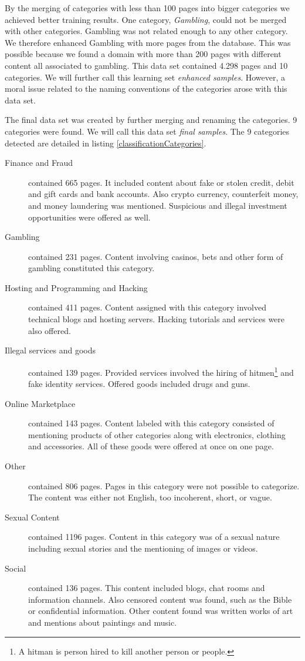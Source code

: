 By the merging of categories with less than 100 pages into bigger categories we achieved better training results. One category, \textit{Gambling}, could not be merged with other categories. Gambling was not related enough to any other category. We therefore enhanced Gambling with more pages from the database. This was possible because we found a domain with more than 200 pages with different content all associated to gambling. This data set contained 4.298 pages and 10 categories. We will further call this learning set \textit{enhanced samples}. However, a moral issue related to the naming conventions of the categories arose with this data set. 

The final data set was created by further merging and renaming the categories. 9 categories were found. We will call this data set \textit{final samples}. The 9 categories detected are detailed in listing \ref{classificationCategories}.
 \label{classificationCategories}
\begin {description}
	\item[Finance and Fraud] contained 665 pages. It included content about fake or stolen credit, debit and gift cards and bank accounts. Also crypto currency, counterfeit money, and money laundering was mentioned. Suspicious and illegal investment opportunities were offered as well.
	\item[Gambling] contained 231 pages. Content involving casinos, bets and other form of gambling constituted this category.
	\item[Hosting and Programming and Hacking] contained 411 pages. Content assigned with this category involved technical blogs and hosting servers. Hacking tutorials and services were also offered.
	\item[Illegal services and goods] contained 139 pages. Provided services involved the hiring of hitmen\footnote{A hitman is person hired to kill another person or people.} and fake identity services. Offered goods included drugs and guns.
	\item[Online Marketplace] contained 143 pages. Content labeled with this category consisted of mentioning products of other categories along with electronics, clothing and accessories. All of these goods were offered at once on one page.
	\item[Other] contained 806 pages. Pages in this category were not possible to categorize. The content was either not English, too incoherent, short, or vague. 
	\item[Sexual Content] contained 1196 pages. Content in this category was of a sexual nature including sexual stories and the mentioning of images or videos.
	\item[Social] contained 136 pages. This content included blogs, chat rooms and information channels. Also censored content was found, such as the Bible or confidential information. Other content found was written works of art and mentions about paintings and music. 
\end{description}

